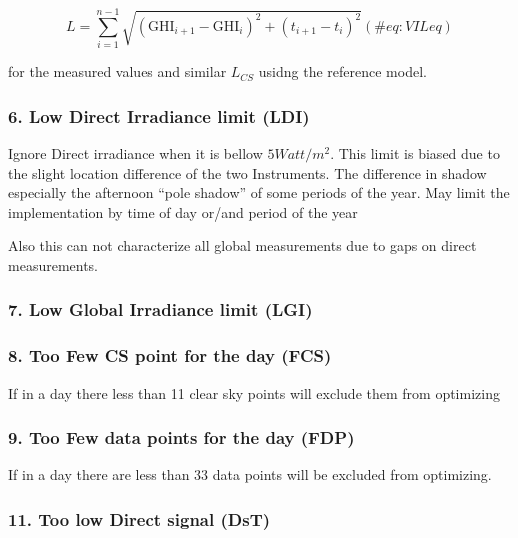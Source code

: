 \documentclass[
  10pt,
  a4paper,oneside]{article}
\begin{document}
\begin{equation}
L = \sum_{i=1}^{n-1}\sqrt{\left ( \text{GHI}_{i+1} - \text{GHI}_{i}\right )^2 + \left ( t_{i+1} - t_i \right )^2}
(\#eq:VILeq)
\end{equation}

for the measured values and similar \(L_{CS}\) usidng the reference model.

\hypertarget{low-direct-irradiance-limit-ldi}{%
\subsubsection{6. Low Direct Irradiance limit (LDI)}\label{low-direct-irradiance-limit-ldi}}

Ignore Direct irradiance when it is bellow \(5 Watt/m^2\).
This limit is biased due to the slight location difference of the two Instruments.
The difference in shadow especially the afternoon ``pole shadow'' of some periods of the year.
May limit the implementation by time of day or/and period of the year

Also this can not characterize all global measurements due to gaps on direct measurements.

\hypertarget{low-global-irradiance-limit-lgi}{%
\subsubsection{7. Low Global Irradiance limit (LGI)}\label{low-global-irradiance-limit-lgi}}

\hypertarget{too-few-cs-point-for-the-day-fcs}{%
\subsubsection{8. Too Few CS point for the day (FCS)}\label{too-few-cs-point-for-the-day-fcs}}

If in a day there less than 11 clear sky points will exclude them from optimizing

\hypertarget{too-few-data-points-for-the-day-fdp}{%
\subsubsection{9. Too Few data points for the day (FDP)}\label{too-few-data-points-for-the-day-fdp}}

If in a day there are less than 33 data points will be excluded from optimizing.

\hypertarget{too-low-direct-signal-dst}{%
\subsubsection{11. Too low Direct signal (DsT)}\label{too-low-direct-signal-dst}}
\end{document}
